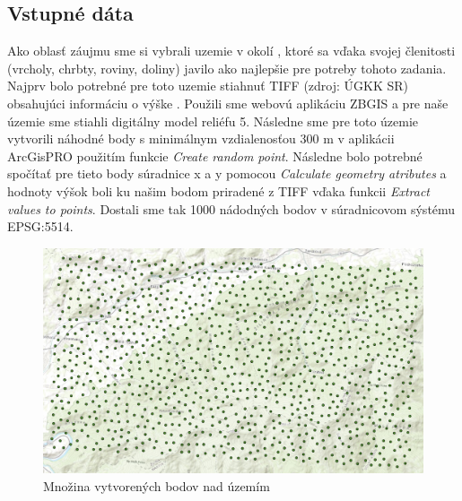 \documentclass[12pt]{article}
\begin{document}
\subsection*{Vstupné dáta}
Ako oblasť  záujmu sme si vybrali uzemie v okolí , ktoré sa vďaka svojej členitosti (vrcholy, chrbty, roviny, doliny) javilo ako najlepšie pre potreby tohoto zadania. Najprv bolo potrebné pre toto uzemie stiahnuť TIFF (zdroj: ÚGKK SR) obsahujúci informáciu o výške . Použili sme webovú aplikáciu ZBGIS a pre naše územie sme stiahli digitálny model reliéfu 5. Následne sme pre toto územie vytvorili náhodné body s minimálnym vzdialenosťou 300 m v aplikácii ArcGisPRO použitím funkcie \textit{Create random point}. Následne bolo potrebné spočítať pre tieto body súradnice x a y pomocou \textit{Calculate geometry atributes} a hodnoty výšok boli ku našim bodom priradené z TIFF vďaka funkcii \textit{Extract values to points}. Dostali sme tak 1000 nádodných bodov v súradnicovom sýstému EPSG:5514.
\begin{figure}[h]
    \centering
    \includegraphics[width=0.8\linewidth]{latex/images/body.jpg}
    \caption{Množina vytvorených bodov nad územím}
    \label{fig:enter-label}
\end{figure}
 
\end{document}
